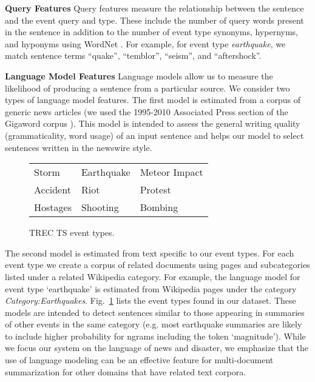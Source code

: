 \textbf{Query Features}
Query features measure the relationship between the sentence and the event 
query and type.  These include the number of query words present in the 
sentence in addition to the number of event type synonyms, hypernyms, and 
hyponyms using WordNet \cite{miller1995wordnet}.  For example, for event type 
\emph{earthquake},  we match sentence terms ``quake'', ``temblor'', ``seism'',
and ``aftershock''.


\textbf{Language Model Features}\label{subsubsec:lm}
Language models allow us to measure the likelihood of producing a sentence 
from a particular source.  We consider two types of language model features.  
The first model is estimated from a corpus of generic news articles (we used 
the 1995-2010 Associated Press section of the Gigaword corpus 
\cite{graff2003english}).  
This model is intended to assess the general writing quality (grammaticality, 
word usage) of an input sentence and helps our model to select sentences
written in the newswire style.  


\begin{figure}
    \center
    \begin{tabular}{|l l l|}
    \hline
    Storm & Earthquake & Meteor Impact\\
    Accident & Riot & Protest\\
    Hostages & Shooting &Bombing\\
    \hline
    \end{tabular}
    \caption{TREC TS event types.}
    \label{fig:eventtypes}
\end{figure}

The second model is estimated from text specific to our event types.  For each
event type we create a corpus of related documents using pages and 
subcategories listed under a related Wikipedia category. For example, the 
language model for event type `earthquake' is estimated from Wikipedia pages 
under the category \emph{Category:Earthquakes}.  Fig.~\ref{fig:eventtypes} 
lists the event types found in our dataset. These models are intended to 
detect sentences similar to those appearing in summaries of other events in 
the same category (e.g. most earthquake summaries are likely to include 
higher probability for ngrams including the token `magnitude'). While we focus
our system on the language of news and disaster, we emphasize that the use of 
language modeling can be an effective feature for multi-document summarization
for other domains that have related text corpora.


